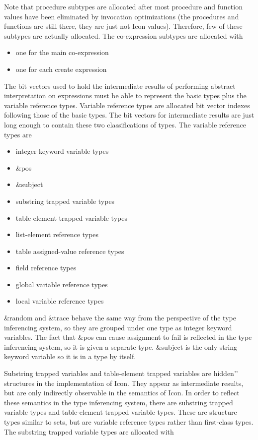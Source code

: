 Note that procedure subtypes are allocated after most procedure and
function values have been eliminated by invocation optimizations (the
procedures and functions are still there, they are just not Icon
values). Therefore, few of these subtypes are actually allocated. The
co-expression subtypes are allocated with

\liststyleLxxviii
\begin{itemize}
\item 
one for the main co-expression 
\item 
one for each create expression 
\end{itemize}

The bit vectors used to hold the intermediate results of performing
abstract interpretation on expressions must be able to represent the
basic types plus the variable reference types. Variable reference
types are allocated bit vector indexes following those of the basic
types. The bit vectors for intermediate results are just long enough
to contain these two classifications of types. The variable reference
types are

\liststyleLxxix
\begin{itemize}
\item 
integer keyword variable types 
\item 
\&pos 
\item 
\&subject 
\item 
substring trapped variable types 
\item 
table-element trapped variable types 
\item 
list-element reference types 
\item 
table assigned-value reference types 
\item 
field reference types 
\item 
global variable reference types 
\item 
local variable reference types 
\end{itemize}

\&random and \&trace behave the same way from the perspective of the
type inferencing system, so they are grouped under one type as integer
keyword variables. The fact that \&pos can cause assignment to fail is
reflected in the type inferencing system, so it is given a separate
type. \&subject is the only string keyword variable so it is in a type
by itself.

Substring trapped variables and table-element trapped variables are
{\textasciigrave}{\textasciigrave}hidden'{}' structures in the
implementation of Icon. They appear as intermediate results, but are
only indirectly observable in the semantics of Icon. In order to
reflect these semantics in the type inferencing system, there are
substring trapped variable types and table-element trapped variable
types. These are structure types similar to sets, but are variable
reference types rather than first-class types. The substring trapped
variable types are allocated with

